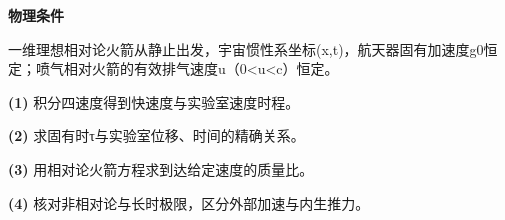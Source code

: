 \textbf{物理条件}\par 一维理想相对论火箭从静止出发，宇宙惯性系坐标(x,t)，航天器固有加速度g0恒定；喷气相对火箭的有效排气速度u（0<u<c）恒定。
\par\noindent\textbf{(1)} 积分四速度得到快速度与实验室速度时程。
\par\noindent\textbf{(2)} 求固有时τ与实验室位移、时间的精确关系。
\par\noindent\textbf{(3)} 用相对论火箭方程求到达给定速度的质量比。
\par\noindent\textbf{(4)} 核对非相对论与长时极限，区分外部加速与内生推力。
